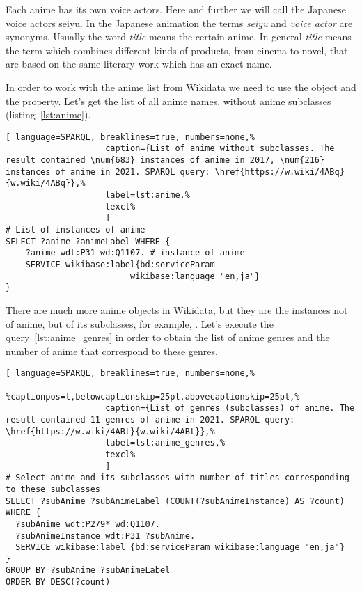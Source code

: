 Each anime has its own voice actors. Here and further we will call the Japanese voice actors seiyu. In the Japanese animation the terms \emph{seiyu} and \emph{voice actor} are synonyms. Usually the word \emph{title} means the certain anime. In general \emph{title} means the term which combines different kinds of products, from cinema to novel, that are based on the same literary work which has an exact name.

In order to work with the anime list from Wikidata we need to use the  object and the  property. Let's get the list of all anime names, without anime subclasses (listing~\ref{lst:anime}).

\begin{lstlisting}[ language=SPARQL, breaklines=true, numbers=none,%
                    caption={List of anime without subclasses. The result contained \num{683} instances of anime in 2017, \num{216} instances of anime in 2021. SPARQL query: \href{https://w.wiki/4ABq}{w.wiki/4ABq}},%
                    label=lst:anime,%
                    texcl%
                    ]
# List of instances of anime
SELECT ?anime ?animeLabel WHERE {
    ?anime wdt:P31 wd:Q1107. # instance of anime
    SERVICE wikibase:label{bd:serviceParam
					     wikibase:language "en,ja"}
}
\end{lstlisting}%

There are much more anime objects in Wikidata, but they are the instances not of anime, but of its subclasses, for example, . Let's execute the query~\ref{lst:anime_genres} in order to obtain the list of anime genres and the number of anime that correspond to these genres.

\begin{widepar}%
	\captionsetup[lstlisting]{%
        format=llapwide18 %
	}%
\begin{lstlisting}[ language=SPARQL, breaklines=true, numbers=none,%
                    %captionpos=t,belowcaptionskip=25pt,abovecaptionskip=25pt,%
                    caption={List of genres (subclasses) of anime. The result contained 11 genres of anime in 2021. SPARQL query: \href{https://w.wiki/4ABt}{w.wiki/4ABt}},%
                    label=lst:anime_genres,%
                    texcl%
                    ]
# Select anime and its subclasses with number of titles corresponding to these subclasses
SELECT ?subAnime ?subAnimeLabel (COUNT(?subAnimeInstance) AS ?count) WHERE {
  ?subAnime wdt:P279* wd:Q1107.
  ?subAnimeInstance wdt:P31 ?subAnime.
  SERVICE wikibase:label {bd:serviceParam wikibase:language "en,ja"}
}
GROUP BY ?subAnime ?subAnimeLabel
ORDER BY DESC(?count)
\end{lstlisting}%
\end{widepar}%

